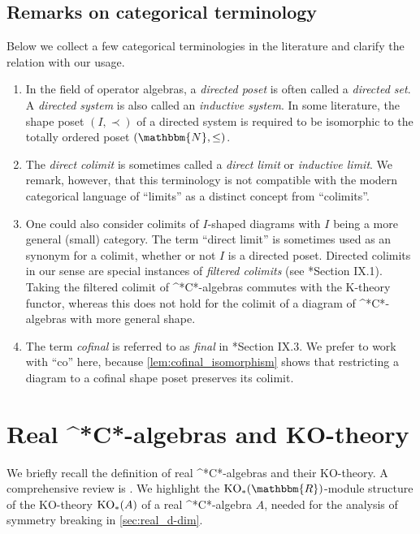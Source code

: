 \documentclass{amsart}
\numberwithin{figure}{section}
\numberwithin{equation}{section}
\numberwithin{table}{section}
\theoremstyle{plain}
\theoremstyle{definition}
\theoremstyle{remark}
\theoremstyle{nonumber}
\newcommand{\N}{\mathbb{N}}
\newcommand{\R}{\mathbb{R}}
\newcommand{\KO}{\relax\ifmmode\operatorname{KO}\else\textup{KO}\fi}
\newcommand{\Cst}{\relax\ifmmode\mathrm{C}^*\else\textup{C*}\fi}
\renewcommand{\mathbb}{\mathbbm} %
\begin{document}
\subsection{Remarks on categorical terminology}
\label{sec:remarks_categorical_terminology}
Below we collect a few categorical terminologies in the literature and clarify the relation with our usage. 
\begin{enumerate}
\item In the field of operator algebras, a \emph{directed poset} 
is often called a \emph{directed set}. A
\emph{directed system} is also called an \emph{inductive system}.
In some literature, the shape poset \( (I,\prec) \) of a directed system 
is required to be isomorphic to the totally ordered poset \( (\N,\leq) \).
\item The \emph{direct colimit} is sometimes called a \emph{direct limit} or
\emph{inductive limit}. We remark, however, that this terminology is not
compatible with the modern categorical language of ``limits'' as a distinct
concept from ``colimits''. 
\item One could also consider colimits of $I$-shaped diagrams with $I$
being a more general (small) category. The term ``direct limit'' is
sometimes used as an synonym for a colimit, whether or not $I$ is a
directed poset. Directed colimits in our sense are special instances of
\emph{filtered colimits} (see
\cite{MacLane:Categories_for_the_working_mathematician}*{Section IX.1}).
Taking the filtered colimit of \Cst-algebras commutes with the K-theory
functor, whereas this does not hold for the colimit of a diagram of
\Cst-algebras with more general shape. 
\item The term \emph{cofinal} is referred to as \emph{final} in
\cite{MacLane:Categories_for_the_working_mathematician}*{Section IX.3}. We
prefer to work with ``co'' here, because \cref{lem:cofinal_isomorphism}
shows that restricting a diagram to a cofinal shape poset 
preserves its colimit.
\end{enumerate}

\section{Real \Cst-algebras and KO-theory}
\label{sec:real_Cst-algebras}
We briefly recall the definition of real \Cst-algebras and their KO-theory.
A comprehensive review is \cite{Boersema-Schochet:Real_K-theory}. We
highlight the \( \KO_*(\R) \)-module structure of the KO-theory \(
\KO_*(A) \) of a real \Cst-algebra \( A \), needed for the analysis of
symmetry breaking in \cref{sec:real_d-dim}.
\end{document}
